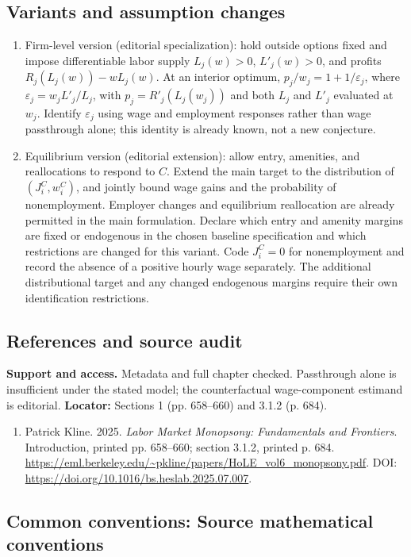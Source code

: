 \documentclass[11pt,a4paper]{article}
\begin{document}
\subsection*{Variants and assumption changes}
\begin{enumerate}
\item Firm-level version (editorial specialization): hold outside options fixed and impose differentiable labor supply \(L_j(w)>0\), \(L'_j(w)>0\), and profits \(R_j(L_j(w))-wL_j(w)\). At an interior optimum, \(p_j/w_j=1+1/\varepsilon_j\), where \(\varepsilon_j=w_jL'_j/L_j\), with \(p_j=R'_j(L_j(w_j))\) and both \(L_j\) and \(L'_j\) evaluated at \(w_j\). Identify \(\varepsilon_j\) using wage and employment responses rather than wage passthrough alone; this identity is already known, not a new conjecture.
\item Equilibrium version (editorial extension): allow entry, amenities, and reallocations to respond to \(C\). Extend the main target to the distribution of \((J_i^C,w_i^C)\), and jointly bound wage gains and the probability of nonemployment. Employer changes and equilibrium reallocation are already permitted in the main formulation. Declare which entry and amenity margins are fixed or endogenous in the chosen baseline specification and which restrictions are changed for this variant. Code \(J_i^C=0\) for nonemployment and record the absence of a positive hourly wage separately. The additional distributional target and any changed endogenous margins require their own identification restrictions.
\end{enumerate}
\subsection*{References and source audit}
\textbf{Support and access.} Metadata and full chapter checked. Passthrough alone is insufficient under the stated model; the counterfactual wage-component estimand is editorial. \textbf{Locator:} Sections 1 (pp. 658--660) and 3.1.2 (p. 684).
\begin{enumerate}\raggedright
\item\hypertarget{definitions:source:30007632:1}{} Patrick Kline. 2025. \emph{Labor Market Monopsony: Fundamentals and Frontiers}. Introduction, printed pp. 658–660; section 3.1.2, printed p. 684.
\url{https://eml.berkeley.edu/~pkline/papers/HoLE_vol6_monopsony.pdf}.
DOI: \url{https://doi.org/10.1016/bs.heslab.2025.07.007}.
\end{enumerate}

\subsection*{Common conventions: Source mathematical conventions}
\end{document}
